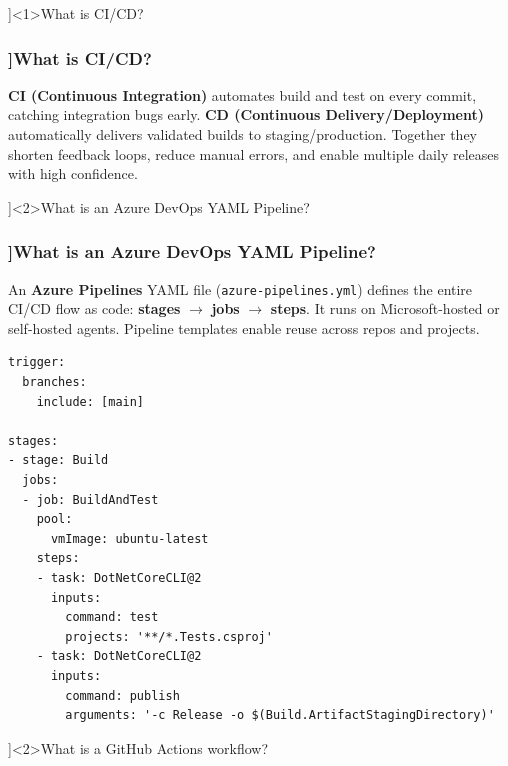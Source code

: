 
\QuestionSlide[\CategoryBadge[CICDColor!20]{CI/CD \& IaC}]<1>{What is CI/CD?}

\begin{frame}[fragile]
  \frametitle{\AnswerTitle[\CategoryBadge[CICDColor!20]{CI/CD \& IaC}]{What is CI/CD?}}

  {\footnotesize
  \textbf{CI (Continuous Integration)} automates build and test on every commit, catching integration bugs early.
  \textbf{CD (Continuous Delivery/Deployment)} automatically delivers validated builds to staging/production. Together they shorten feedback loops, reduce manual errors, and enable multiple daily releases with high confidence.
  }
\end{frame}

\QuestionSlide[\CategoryBadge[CICDColor!20]{CI/CD \& IaC}]<2>{What is an Azure DevOps YAML Pipeline?}

\begin{frame}[fragile]
  \frametitle{\AnswerTitle[\CategoryBadge[CICDColor!20]{CI/CD \& IaC}]{What is an Azure DevOps YAML Pipeline?}}

  {\footnotesize
  An \textbf{Azure Pipelines} YAML file (\texttt{azure-pipelines.yml}) defines the entire CI/CD flow as code: \textbf{stages} $\to$ \textbf{jobs} $\to$ \textbf{steps}. It runs on Microsoft-hosted or self-hosted agents. Pipeline templates enable reuse across repos and projects.
  }

  \begin{verbatim}
trigger:
  branches:
    include: [main]

stages:
- stage: Build
  jobs:
  - job: BuildAndTest
    pool:
      vmImage: ubuntu-latest
    steps:
    - task: DotNetCoreCLI@2
      inputs:
        command: test
        projects: '**/*.Tests.csproj'
    - task: DotNetCoreCLI@2
      inputs:
        command: publish
        arguments: '-c Release -o $(Build.ArtifactStagingDirectory)'
  \end{verbatim}
\end{frame}

\QuestionSlide[\CategoryBadge[CICDColor!20]{CI/CD \& IaC}]<2>{What is a GitHub Actions workflow?}

